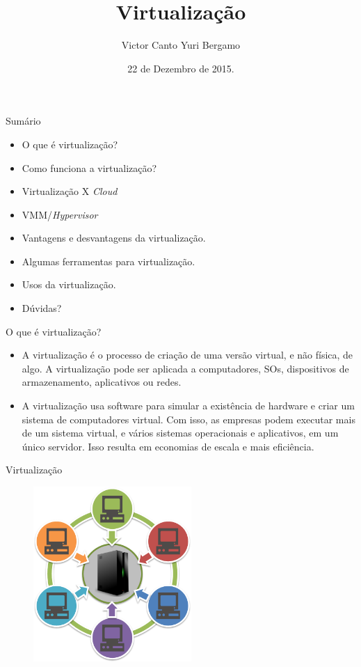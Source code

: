 \documentclass{beamer}
\title{Virtualização}
\author{Victor Canto\inst{1} Yuri Bergamo\inst{2}}
\institute[UNESP] %
{
  Sistemas Distribuídos \newline \newline 
  \inst{1}%
  Bacharelado em Ciência da Computação \\
  
  \inst{2}%
  Bacharelado em Sistemas de Informação \newline \newline
  Universidade Estadual Paulista “Júlio de Mesquita Filho” - UNESP
}
\date{22 de Dezembro de 2015.}
\begin{document}
\begin{frame}
  \titlepage
\end{frame}

\begin{frame}{Sumário}
  \begin{itemize}
  \item
    O que é virtualização?
  
  \item
    Como funciona a virtualização?
   
  \item
    Virtualização X {\it Cloud}
   
  \item
    VMM/{\it Hypervisor}

  \item 
    Vantagens e desvantagens da virtualização.
  
  \item 
    Algumas ferramentas para virtualização.
  
  \item 
    Usos da virtualização.
    
   \item
    Dúvidas?
  
  \end{itemize}
\end{frame}



\begin{frame}{O que é virtualização?}
\begin{itemize}
 \item  A virtualização é o processo de criação de uma versão virtual, e não física, de algo. A virtualização pode ser aplicada a 
 computadores, SOs, dispositivos de armazenamento, aplicativos ou redes.
 \item A virtualização usa software para simular a existência de hardware e criar um sistema de computadores
virtual. Com isso, as empresas podem executar mais de um sistema virtual, e vários sistemas
operacionais e aplicativos, em um único servidor. Isso resulta em economias de escala e mais eficiência.
\end{itemize}
\end{frame}

\begin{frame}{Virtualização}
\begin{figure}[hbtp]
\centering
\includegraphics[width=6cm]{Images/virt.png}
\label{figRotulo}
\end{figure}
\end{frame}
\end{document}
